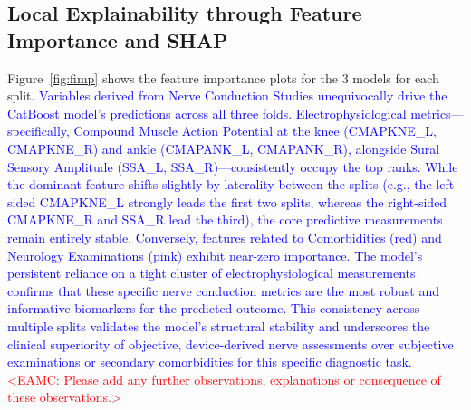 \documentclass[fleqn,10pt]{wlscirep}
\begin{document}
\subsection*{Local Explainability through Feature Importance and SHAP}

Figure~\ref{fig:fimp} shows the feature importance plots  for the 3 models for each split.  \textcolor{blue}{Variables derived from Nerve Conduction Studies unequivocally drive the CatBoost model's predictions across all three folds. Electrophysiological metrics—specifically, Compound Muscle Action Potential at the knee (CMAPKNE\_L, CMAPKNE\_R) and ankle (CMAPANK\_L, CMAPANK\_R), alongside Sural Sensory Amplitude (SSA\_L, SSA\_R)—consistently occupy the top ranks. While the dominant feature shifts slightly by laterality between the splits (e.g., the left-sided CMAPKNE\_L strongly leads the first two splits, whereas the right-sided CMAPKNE\_R and SSA\_R lead the third), the core predictive measurements remain entirely stable. Conversely, features related to Comorbidities (red) and Neurology Examinations (pink) exhibit near-zero importance. The model's persistent reliance on a tight cluster of electrophysiological measurements confirms that these specific nerve conduction metrics are the most robust and informative biomarkers for the predicted outcome. This consistency across multiple splits validates the model's structural stability and underscores the clinical superiority of objective, device-derived nerve assessments over subjective examinations or secondary comorbidities for this specific diagnostic task.}\textcolor{red}{<EAMC: Please add any further observations, explanations or consequence of these observations.>}
\end{document}
